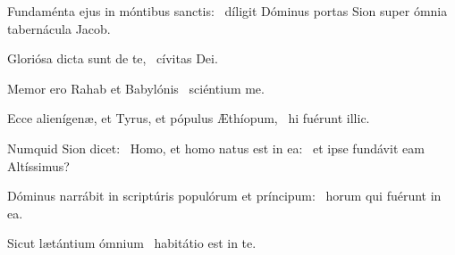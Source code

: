 \item Fundaménta ejus in móntibus sanctis:~\psstar{} díligit Dóminus portas Sion super ómnia tabernácula Jacob.

\item Gloriósa dicta sunt de te,~\psstar{} cívitas Dei.

\item Memor ero Rahab et Babylónis~\psstar{} sciéntium me.

\item Ecce alienígenæ, et Tyrus, et pópulus Æthíopum,~\psstar{} hi fuérunt illic.

\item Numquid Sion dicet:~\pscross{} Homo, et homo natus est in ea:~\psstar{} et ipse fundávit eam Altíssimus?

\item Dóminus narrábit in scriptúris populórum et príncipum:~\psstar{} horum qui fuérunt in ea.

\item Sicut lætántium ómnium~\psstar{} habitátio est in te.
